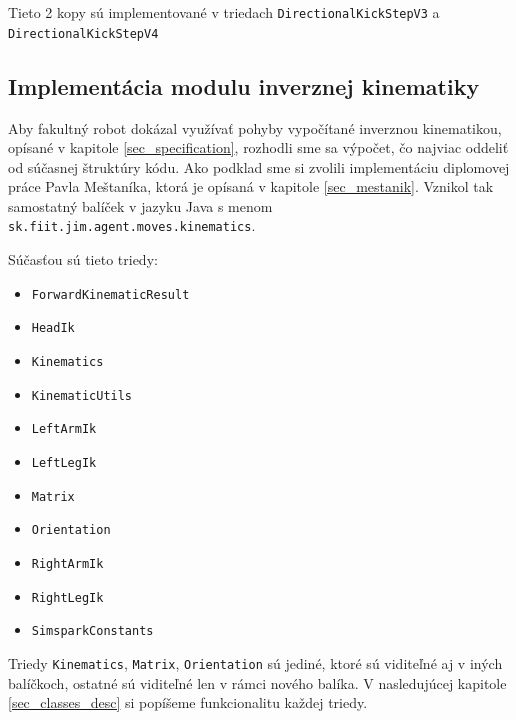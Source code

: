 Tieto 2 kopy sú implementované v triedach \texttt{DirectionalKickStepV3} a \texttt{DirectionalKickStepV4}

\subsection{Implementácia modulu inverznej kinematiky} \label{sec_implementation}

Aby fakultný robot dokázal využívať pohyby vypočítané inverznou kinematikou, opísané v kapitole \ref{sec_specification}, rozhodli sme sa výpočet, čo najviac oddeliť od súčasnej štruktúry kódu. Ako podklad sme si zvolili implementáciu diplomovej práce Pavla Meštaníka, ktorá je opísaná v kapitole \ref{sec_mestanik}. Vznikol tak samostatný balíček v jazyku Java s menom \texttt{sk.fiit.jim.agent.moves.kinematics}. 

Súčasťou sú tieto triedy:
\begin{itemize}
	\item \texttt{ForwardKinematicResult}
	\item \texttt{HeadIk}
	\item \texttt{Kinematics}
	\item \texttt{KinematicUtils}
	\item \texttt{LeftArmIk}
	\item \texttt{LeftLegIk}
	\item \texttt{Matrix}
	\item \texttt{Orientation}
	\item \texttt{RightArmIk}
	\item \texttt{RightLegIk}
	\item \texttt{SimsparkConstants}
\end{itemize}

Triedy \texttt{Kinematics}, \texttt{Matrix}, \texttt{Orientation} sú jediné, ktoré sú viditeľné aj v iných balíčkoch, ostatné sú viditeľné len v rámci nového balíka. V nasledujúcej kapitole \ref{sec_classes_desc} si popíšeme funkcionalitu každej triedy.

